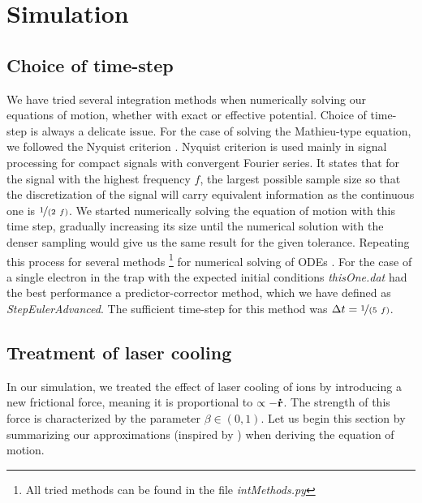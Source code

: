 	
\section{Simulation}
\label{sec:simulation}

\subsection{Choice of time-step}

We have tried several integration methods when numerically solving our equations of motion, whether with exact or effective potential.
Choice of time-step is always a delicate issue. For the case of solving the Mathieu-type equation, we followed the Nyquist criterion . Nyquist criterion is used mainly in signal processing for compact signals with convergent Fourier series. It states that for the signal with the highest frequency $f$, the largest possible sample size so that the discretization of the signal will carry equivalent information as the continuous one is $\nicefrac{1}{(2 \ f)}$. We started numerically solving the equation of motion with this time step, gradually increasing its size until the numerical solution with the denser sampling would give us the same result for the given tolerance. Repeating this process for several methods \footnote{All tried methods can be found in the file \textit{intMethods.py}} for numerical solving of ODEs \cite{teukolsky1992numerical}. For the case of a single electron in the trap with the expected initial conditions \textit{thisOne.dat} had the best performance a predictor-corrector method, which we have defined as \textit{StepEulerAdvanced}. The sufficient time-step for this method was $\Delta t = \nicefrac{1}{(5 \ f)}$. 


\subsection{Treatment of laser cooling}
In our simulation, we treated the effect of laser cooling of ions by introducing a new frictional force, meaning it is proportional to $\propto - \vb{\dot{r}}$. The strength of this force is characterized by the parameter $\beta \in (0,1)$. 
Let us begin this section by summarizing our approximations (inspired by \cite{Friedman_1982}) when deriving the equation of motion. 

